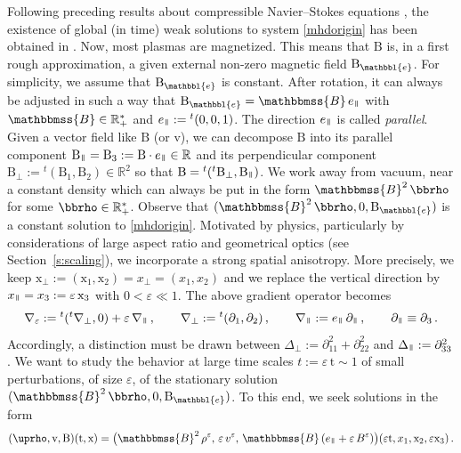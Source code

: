 \documentclass[11pt,reqno]{amsart}
\def \R{{\mathbb{R}}}
\newcommand{\myparallel}{{\mkern3mu\vphantom{\perp}\vrule depth 0pt\mkern2mu\vrule depth 0pt\mkern3mu}}
\begin{document}
Following preceding results about  compressible Navier--Stokes equations  \cite{FNP01,Lio98}, the existence of global (in time) weak solutions to system \eqref{mhdorigin} has been obtained in \cite{HW10}. Now, most plasmas are magnetized. This means that $ \text{B} $ is, in a first rough approximation, a given  external non-zero magnetic field $\text{B}_{\mathbbl{e}} $. For simplicity, we assume that $ \text{B}_{\mathbbl{e}} $ is constant. After rotation, it can always be adjusted in such a way that $ \text{B}_{\mathbbl{e}} = \mathbbmss{B} \, e_\myparallel $ with $ \mathbbmss{B} \in \R_+^* $ and $ e_\myparallel :={}^t(0,0,1) $. The direction $e_\myparallel $ is called {\it parallel}. Given a vector field like $ \text{B} $ (or $ \text{v} $), we can decompose $ \text{B} $ into its parallel component $ \text{B}_\myparallel =\text{B}_3 := \text{B} \cdot e_\myparallel \in \R $ and its perpendicular component $ \text{B}_\perp := {}^t (\text{B}_1,\text{B}_2) \in \R^2 $ so that $ \text{B} = {}^t ({}^t \text{B}_\perp, \text{B}_\myparallel )$. We work away from vacuum, near a constant density which can always be put in the form $ \mathbbmss{B}^2 \, \bbrho $ for some $  \bbrho \in \R_+^* $. Observe that $ (\mathbbmss{B}^2 \, \bbrho, 0, \text{B}_{\mathbbl{e}}) $ is a constant solution to \eqref{mhdorigin}. Motivated by physics, particularly  by considerations of large aspect ratio and geometrical optics (see Section~\ref{s:scaling}), we incorporate a strong spatial anisotropy. More precisely, we keep $ \text{x}_\perp := (\text{x}_1,\text{x}_2) = x_\perp = (x_1,x_2) $ and we replace the vertical direction by $ x_\myparallel = x_3 := \varepsilon \, \text{x}_3 $ with $ 0 < \varepsilon \ll 1 $. The above gradient operator becomes
\begin{equation}
  \label{nablaeps}
  \nabla_\varepsilon :=  {}^t ({}^t \nabla_\perp,0) + \varepsilon \,  \nabla_\myparallel \, , \qquad \nabla_\perp := {}^t (\partial_1,\partial_2) \, , \qquad
  \nabla_\myparallel := e_\myparallel \,  \partial_\myparallel
  \, , \qquad \partial_\myparallel \equiv \partial_3 \,.
\end{equation}
Accordingly,  a distinction must be  drawn between $ \Delta_\perp := \partial^2_{11} + \partial^2_{22} $ and $  \Delta_\myparallel := \partial^2_{33} $. We want to study the behavior at large time scales $ t := \varepsilon \, \text{t} \sim 1 $ of small perturbations, of size $ \varepsilon $, of the stationary solution $ ( \mathbbmss{B}^2 \, \bbrho, 0, \text{B}_{\mathbbl{e}}) $. To this end, we seek solutions in the form
\[
( \uprho ,\text{v},\text{B}) (\text{t},\text{x}) = \bigl(   \mathbbmss{B}^2 \, \rho^\varepsilon ,\, \varepsilon \, v^\varepsilon, \, \mathbbmss{B} \, ( e_\myparallel + \varepsilon \, B^\varepsilon ) \bigr) (\varepsilon \text{t},{x}_1,\text{x}_2, \varepsilon \text{x}_3 ) \, .
\]
\end{document}
